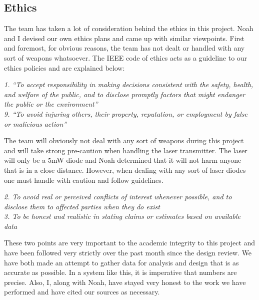 \documentclass[letterpaper,10pt]{article}
\begin{document}
\begin{spacing}{1.15}
\section{Ethics}
The team has taken a lot of consideration behind the ethics in this project. Noah and I devised our own ethics plans and came up with similar viewpoints. First and foremost, for obvious reasons, the team has not dealt or handled with any sort of weapons whatsoever. The IEEE code of ethics acts as a guideline to our ethics policies and are explained below:

\textit{1. ``To accept responsibility in making decisions consistent with the safety, health, and welfare of the public, and to disclose promptly factors that might endanger the public or the environment”\\
9. ``To avoid injuring others, their property, reputation, or employment by false or malicious action”}

\setlength{\leftskip}{24pt} The team will obviously not deal with any sort of weapons during this project and will take strong pre-caution when handling the laser transmitter. The laser will only be a 5mW diode and Noah determined that it will not harm anyone that is in a close distance. However, when dealing with any sort of laser diodes one must handle with caution and follow guidelines.

\setlength{\leftskip}{0pt}\textit{2. To avoid real or perceived conflicts of interest whenever possible, and to disclose them to affected parties when they do exist\\
3. To be honest and realistic in stating claims or estimates based on available data}

\setlength{\leftskip}{24pt} These two points are very important to the academic integrity to this project and have been followed very strictly over the past month since the design review. We have both made an attempt to gather data for analysis and design that is as accurate as possible. In a system like this, it is imperative that numbers are precise. Also, I, along with Noah, have stayed very honest to the work we have performed and have cited our sources as necessary. 




\end{spacing}
\end{document}
